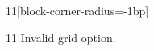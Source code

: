 \documentclass[paper=A4]{ropas-poster}
\begin{document}
\begin{postergrid}{1}{1}[block-corner-radius=-1bp]
\begin{posterblock}{1}{1}
Invalid grid option.
\end{posterblock}
\end{postergrid}
\end{document}
